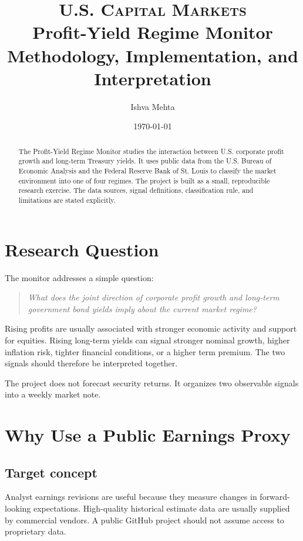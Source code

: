 \documentclass[11pt]{article}
\title{\vspace{-2em}
{\Large\textsc{U.S. Capital Markets}}\\[0.7em]
{\huge\bfseries Profit-Yield Regime Monitor}\\[0.5em]
{\large Methodology, Implementation, and Interpretation}}
\author{Ishva Mehta}
\date{\today}
\begin{document}
\maketitle

\begin{abstract}
The Profit-Yield Regime Monitor studies the interaction between U.S. corporate
profit growth and long-term Treasury yields. It uses public data from the U.S.
Bureau of Economic Analysis and the Federal Reserve Bank of St. Louis to
classify the market environment into one of four regimes. The project is
built as a small, reproducible research exercise. The data sources, signal
definitions, classification rule, and limitations are stated explicitly.
\end{abstract}

\tableofcontents
\newpage

\section{Research Question}

The monitor addresses a simple question:

\begin{quote}
\emph{What does the joint direction of corporate profit growth and long-term
government bond yields imply about the current market regime?}
\end{quote}

Rising profits are usually associated with stronger economic activity and
support for equities. Rising long-term yields can signal stronger nominal
growth, higher inflation risk, tighter financial conditions, or a higher term
premium. The two signals should therefore be interpreted together.

The project does not forecast security returns. It organizes two observable
signals into a weekly market note.

\section{Why Use a Public Earnings Proxy}

\subsection{Target concept}

Analyst earnings revisions are useful because they measure changes in
forward-looking expectations. High-quality historical estimate data are
usually supplied by commercial vendors. A public GitHub project should not
assume access to proprietary data.
\end{document}
